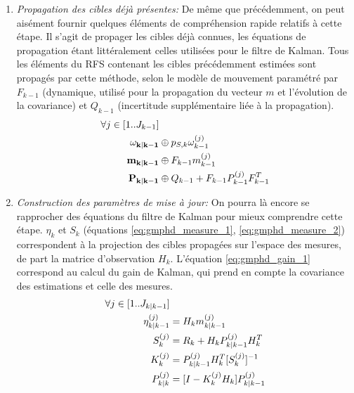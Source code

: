 \begin{enumerate}
	\item{\emph{Propagation des cibles déjà présentes:}}
		De même que précédemment, on peut aisément fournir quelques éléments de compréhension rapide relatifs à cette étape. Il s'agit de propager les cibles déjà connues, les équations de propagation étant littéralement celles utilisées pour le filtre de Kalman. Tous les éléments du RFS contenant les cibles précédemment estimées sont propagés par cette méthode, selon le modèle de mouvement paramétré par $F_{k-1}$ (dynamique, utilisé pour la propagation du vecteur $m$ et l'évolution de la covariance) et $Q_{k-1}$ (incertitude supplémentaire liée à la propagation). \newline
		\begin{align}
	 		\forall j \in [1 .. J_{k-1}]& \notag \\
	 			\mathbf{\omega_{k|k-1}} &\oplus p_{S,k} \omega_{k-1}^{(j)}					\\
	 			\mathbf{m_{k|k-1}} 		&\oplus F_{k-1} m_{k-1}^{(j)} 						\\
	 			\mathbf{P_{k|k-1}}		&\oplus Q_{k-1} + F_{k-1} P_{k-1}^{(j)} F_{k-1}^T
		\end{align}

	\item{\emph{Construction des paramètres de mise à jour:}}
		On pourra là encore se rapprocher des équations du filtre de Kalman pour mieux comprendre cette étape. $\eta_k$ et $S_k$ (équations \ref{eq:gmphd_measure_1}, \ref{eq:gmphd_measure_2}) correspondent à la projection des cibles propagées sur l'espace des mesures, de part la matrice d'observation $H_k$. L'équation \ref{eq:gmphd_gain_1} correspond au calcul du gain de Kalman, qui prend en compte la covariance des estimations et celle des mesures.\newline
		\begin{align}
			\forall j \in [1 .. J_{k|k-1}]& 							\notag \\
				\eta_{k|k-1}^{(j)} 	&= H_k m_{k|k-1}^{(j)} 					 		\label{eq:gmphd_measure_1}\\
				S_k^{(j)} 					&= R_k + H_k P_{k|k-1}^{(j)} H_k^T 	\label{eq:gmphd_measure_2}\\
				K_k^{(j)} 					&= P_{k|k-1}^{(j)} H_k^T [S_k^{(j)}]^{-1} \label{eq:gmphd_gain_1}\\
				P_{k|k}^{(j)}	 			&= [ I - K_k^{(j)} H_k ] P_{k|k-1}^{(j)}	\label{eq:gmphd_gain_2}
		\end{align}
		

\end{enumerate}
